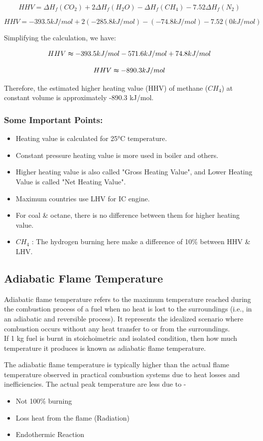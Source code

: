\documentclass{article}
\begin{document}
$$HHV = \Delta H_f(CO_2) + 2\Delta H_f(H_2O) - \Delta H_f(CH_4) - 7.52\Delta H_f(N_2)$$

$$HHV = -393.5 kJ/mol + 2(-285.8 kJ/mol) - (-74.8 kJ/mol) - 7.52(0 kJ/mol)$$

Simplifying the calculation, we have:

$$HHV \thickapprox  -393.5 kJ/mol - 571.6 kJ/mol + 74.8 kJ/mol$$

$$ HHV \thickapprox -890.3 kJ/mol$$

Therefore, the estimated higher heating value (HHV) of methane ($CH_4$) at constant volume is approximately -890.3 kJ/mol.

\subsubsection*{Some Important Points:}
\begin{itemize}
  \item Heating value is calculated for 25°C temperature. 
  \item Constant pressure heating value is more used in boiler and others.
  \item Higher heating value is also called "Gross Heating Value", and Lower Heating Value is called "Net Heating Value". 
  \item Maximum countries use LHV for IC engine. 
  \item For coal \& octane, there is no difference between them for higher heating value. 
  \item $CH_4$ : The hydrogen burning here make a difference of 10\% between HHV \& LHV.  
\end{itemize}

\subsection*{Adiabatic Flame Temperature}
Adiabatic flame temperature refers to the maximum temperature reached during the combustion process of a fuel when no heat is lost to the surroundings (i.e., in an adiabatic and reversible process). It represents the idealized scenario where combustion occurs without any heat transfer to or from the surroundings.\\
If 1 kg fuel is burnt in stoichoimetric and isolated condition, then how much temperature it produces is known as adiabatic flame temperature. 

The adiabatic flame temperature is typically higher than the actual flame temperature observed in practical combustion systems due to heat losses and inefficiencies. The actual peak temperature are less due to - 
\begin{itemize}
  \item Not 100\% burning 
  \item Loss heat from the flame (Radiation)
  \item Endothermic Reaction 
\end{itemize}
\end{document}
